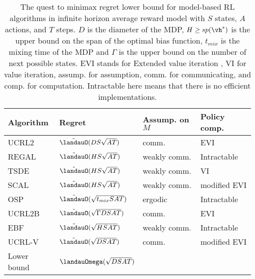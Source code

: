 \begin{table}[ht]
\begin{tabular}{|l|l|l|l|}
\hline
Algorithm & Regret & Assump. on $M$ & Policy comp.            \\ \hline
UCRL2 \cite{jaksch2010near}       & $\tilde{\landauO}(DS\sqrt{AT})$ & comm.         & EVI \\ 
REGAL \cite{bartlett2012regal}      & $\tilde{\landauO}(HS\sqrt{AT})$  & weakly comm. & Intractable   \\ 
TSDE \cite{ouyang2017learning}        & $\tilde{\landauO}(HS\sqrt{AT})$ & weakly comm. & VI       \\ 
SCAL \cite{fruit2018efficient}        & $\tilde{\landauO}(HS\sqrt{AT})$ & weakly comm. & modified EVI           \\
OSP \cite{ortner2020regret}         & $\tilde{\landauO}(\sqrt{t_{mix}SAT})$ & ergodic           & Intractable   \\ 
UCRL2B \cite{fruit2020improved}      & $\tilde{\landauO}(\sqrt{\Gamma DSAT})$ & comm.      & EVI                           \\
EBF \cite{zhang2019regret}         & $\tilde{\landauO}(\sqrt{HSAT})$ & weakly comm.     & Intractable   \\
UCRL-V \cite{tossou2019near}         & $\tilde{\landauO}(\sqrt{DSAT})$ & comm.     & modified EVI   \\ \hline
Lower bound & $\landauOmega(\sqrt{DSAT})$ \cite{jaksch2010near} &                              &                               \\ \hline
\end{tabular}
\caption{The quest to minimax regret lower bound for model-based RL algorithms in infinite horizon average reward model with $S$ states, $A$ actions, and $T$ steps.
$D$ is the diameter of the MDP, $H\ge sp(\vh^*)$ is the upper bound on the span of the optimal bias function, $t_{mix}$ is the mixing time of the MDP and $\Gamma$ is the upper bound on the number of next possible states.
EVI stands for Extended value iteration \cite{jaksch2010near}, VI for value iteration, assump. for assumption, comm. for communicating, and comp. for computation.
Intractable here means that there is no efficient implementations.
}
\label{ch:rl:tab:infinite}
\end{table}


